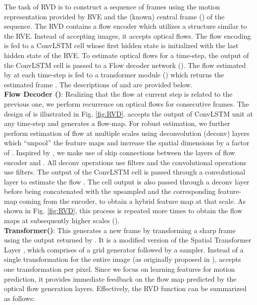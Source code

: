 \documentclass[10pt,twocolumn,letterpaper]{article}
\begin{document}
The task of RVD is to construct a sequence of frames using the motion representation provided by RVE and the (known) central frame () of the sequence. The RVD contains a flow encoder which utilizes a structure similar to the RVE. Instead of accepting images, it accepts optical flows. The flow encoding is fed to a ConvLSTM cell whose first hidden state is initialized with the last hidden state  of the RVE. To estimate optical flows for a time-step, the output of the ConvLSTM cell is passed to a Flow decoder network (). The flow estimated by  at each time-step is fed to a transformer module () which returns the estimated frame . The descriptions of  and  are provided below.
\\
\textbf{Flow Decoder ()}:
Realizing that the flow at current step is related to the previous one, 
we perform recurrence on optical flows for consecutive frames. The design of  is illustrated in Fig. \ref{fig:RVD}. 
 accepts the output of ConvLSTM unit at any time-step and generates a flow-map. For robust estimation, we further perform estimation of flow at multiple scales using deconvolution (deconv) layers which ``unpool'' the feature maps and increase the spatial dimensions by a factor of . Inspired by \cite{ronneberger2015u}, we make use of skip connections between the layers of flow encoder and .
All deconv operations use  filters and the convolutional operations use  filters. The output of the ConvLSTM cell is passed through a convolutional layer to estimate the flow . The cell output is also passed through a deconv layer before being concatenated with the upsampled  and the corresponding feature-map coming from the encoder, to obtain a hybrid feature map at that scale. As shown in Fig. \ref{fig:RVD}, this process is repeated  more times to obtain the flow maps at subsequently higher scales ().
\\
\textbf{Transformer()}: This generates a new frame by transforming a sharp frame using the output returned by . It is a modified version of the Spatial Transformer Layer \cite{jaderberg2015spatial}, which comprises of a grid generator followed by a sampler. Instead of a single transformation for the entire image (as originally proposed in \cite{jaderberg2015spatial}),  accepts one transformation per pixel. Since we focus on learning features for motion prediction, it provides immediate feedback on the flow map predicted by the optical flow generation layers. Effectively, the RVD function can be summarized as follows:
\vspace{-1mm}
\end{document}
